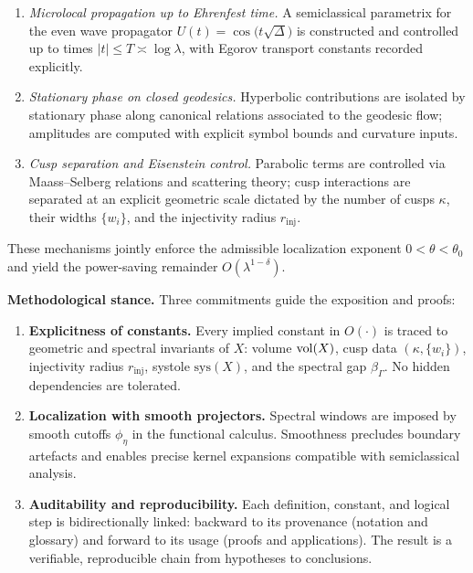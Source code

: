 \begin{enumerate}[label=\arabic*.]
  \item \emph{Microlocal propagation up to Ehrenfest time.}
  A semiclassical parametrix for the even wave propagator
  $U(t)=\cos\!\big(t\sqrt{\Delta}\big)$ is constructed and controlled up to
  times $|t|\le T\asymp \log\lambda$, with Egorov transport constants recorded
  explicitly.

  \item \emph{Stationary phase on closed geodesics.}
  Hyperbolic contributions are isolated by stationary phase along canonical
  relations associated to the geodesic flow; amplitudes are computed with
  explicit symbol bounds and curvature inputs.

  \item \emph{Cusp separation and Eisenstein control.}
  Parabolic terms are controlled via Maass–Selberg relations and scattering
  theory; cusp interactions are separated at an explicit geometric scale
  dictated by the number of cusps $\kappa$, their widths $\{w_i\}$, and the
  injectivity radius $r_{\mathrm{inj}}$.
\end{enumerate}

These mechanisms jointly enforce the admissible localization exponent
$0<\theta<\theta_0$ and yield the power-saving remainder $O(\lambda^{1-\delta})$.

\medskip

\noindent\textbf{Methodological stance.}
Three commitments guide the exposition and proofs:

\begin{enumerate}[label=\arabic*.]
  \item \textbf{Explicitness of constants.}
  Every implied constant in $O(\cdot)$ is traced to geometric and spectral
  invariants of $X$: volume $\operatorname{vol}(X)$, cusp data $(\kappa,\{w_i\})$,
  injectivity radius $r_{\mathrm{inj}}$, systole $\mathrm{sys}(X)$, and the
  spectral gap $\beta_\Gamma$. No hidden dependencies are tolerated.

  \item \textbf{Localization with smooth projectors.}
  Spectral windows are imposed by smooth cutoffs $\phi_\eta$ in the functional
  calculus. Smoothness precludes boundary artefacts and enables precise kernel
  expansions compatible with semiclassical analysis.

  \item \textbf{Auditability and reproducibility.}
  Each definition, constant, and logical step is bidirectionally linked:
  backward to its provenance (notation and glossary) and forward to its usage
  (proofs and applications). The result is a verifiable, reproducible chain
  from hypotheses to conclusions.
\end{enumerate}

